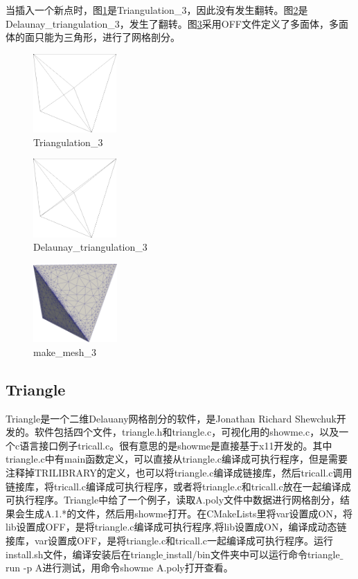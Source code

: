 当插入一个新点时，图\ref{fig:1-5}是Triangulation\_3，因此没有发生翻转。图\ref{fig:1-6}是Delaunay\_triangulation\_3，发生了翻转。图\ref{fig:1-7}采用OFF文件定义了多面体，多面体的面只能为三角形，进行了网格剖分。
\begin{figure}[!htbp]
  \centering
  \includegraphics[height=3cm]{fig/1/5.png}
  \caption{Triangulation\_3}
  \label{fig:1-5}
\end{figure}
\begin{figure}[!htbp]
  \centering
  \includegraphics[height=3cm]{fig/1/6.png}
  \caption{Delaunay\_triangulation\_3}
  \label{fig:1-6}
\end{figure}
\begin{figure}[!htbp]
  \centering
  \includegraphics[height=3cm]{fig/1/7.png}
  \caption{make\_mesh\_3}
  \label{fig:1-7}
\end{figure}


\subsection{Triangle}

Triangle是一个二维Delauany网格剖分的软件，是Jonathan Richard Shewchuk开发的。软件包括四个文件，triangle.h和triangle.c，可视化用的showme.c，以及一个c语言接口例子tricall.c。很有意思的是showme是直接基于x11开发的。其中triangle.c中有main函数定义，可以直接从triangle.c编译成可执行程序，但是需要注释掉TRILIBRARY的定义，也可以将triangle.c编译成链接库，然后tricall.c调用链接库，将tricall.c编译成可执行程序，或者将triangle.c和tricall.c放在一起编译成可执行程序。Triangle中给了一个例子，读取A.poly文件中数据进行网格剖分，结果会生成A.1.*的文件，然后用showme打开。在CMakeLists里将var设置成ON，将lib设置成OFF，是将triangle.c编译成可执行程序,将lib设置成ON，编译成动态链接库，var设置成OFF，是将triangle.c和tricall.c一起编译成可执行程序。运行install.sh文件，编译安装后在triangle$\_$install/bin文件夹中可以运行命令triangle$\_$run -p A进行测试，用命令showme A.poly打开查看。


